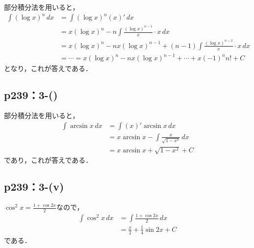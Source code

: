 \begin{tanswer}
    部分積分法を用いると，
    \begin{align*}
        \int (\log x)^n \, dx & = \int (\log x)^n  (x)' \, dx                                                           \\
                              & = x (\log x)^n - n \int  \frac{(\log x)^{n-1}}{x} \cdot  x \, dx                        \\
                              & =  x (\log x)^n - n x(\log x)^{n-1} + (n-1) \int \frac{(\log x)^{n-2}}{x} \cdot x \, dx \\
                              & = \cdots = x (\log x)^n - n x(\log x)^{n-1} + \cdots + x(-1)^n n!+C
    \end{align*}
    となり，これが答えである．
\end{tanswer}

\subsection*{p239：3-()}
\begin{tanswer}
    部分積分法を用いると，
    \begin{align*}
        \int \arcsin x \, dx & = \int (x)' \arcsin x \, dx                        \\
                             & = x \arcsin x  - \int \frac{x}{\sqrt{1-x^2}} \, dx \\
                             & = x \arcsin x + \sqrt{1-x^2} + C
    \end{align*}
    であり，これが答えである．
\end{tanswer}

\subsection*{p239：3-(v)}

\begin{tanswer}
    $\cos ^2 x = \frac{1+\cos 2x}{2}$なので，
    \begin{align*}
        \int \cos ^2 x \, dx & = \int \frac{1+\cos 2x}{2} \, dx      \\
                             & = \frac{x}{2}+\frac{1}{4} \sin 2x + C
    \end{align*}
    である．
\end{tanswer}



